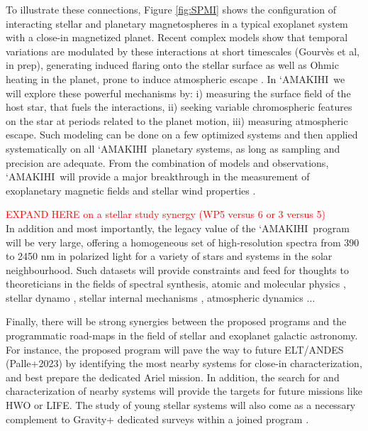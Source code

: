 \documentclass[
    traditabstract,
    longauth,
    onecolumn,
]{aa}
\def \amakihi{`AMAKIHI}
\begin{document}
To illustrate these connections, Figure \ref{fig:SPMI} shows the configuration of interacting stellar and planetary magnetospheres in a typical exoplanet system with a close-in magnetized planet. Recent complex models show that temporal variations are modulated by these interactions at short timescales (Gourv\`es et al, in prep), generating induced flaring onto the stellar surface as well as Ohmic heating in the planet, prone to induce atmospheric escape \citep{strugarek2025}. In \amakihi\, we will explore these powerful mechanisms by: i) measuring the surface field of the host star, that fuels the interactions, ii) seeking variable chromospheric features on the star at periods related to the planet motion, iii) measuring atmospheric escape. Such modeling can be done on a few optimized systems and then applied systematically on all \amakihi\ planetary systems, as long as sampling and precision are adequate. From the combination of models and observations, \amakihi\ will provide a major breakthrough in the measurement of exoplanetary magnetic fields and stellar wind properties \citep{vidotto2025}.

\textcolor{red}{EXPAND HERE on a stellar study synergy (WP5 versus 6 or 3 versus 5)}\\

In addition and most importantly, the legacy value of the \amakihi\ program will be very large, offering a homogeneous set of high-resolution spectra from 390 to 2450 nm in polarized light for a variety of stars and systems in the solar neighbourhood. Such datasets will provide constraints and feed for thoughts to theoreticians in the fields of spectral synthesis, atomic and molecular physics \citep{crozet2023}, stellar dynamo \citep{zaire2022}, stellar internal mechanisms \citep{jouve2020}, atmospheric dynamics \citep{dhouib2024}...


Finally, there will be strong synergies between the proposed programs and the programmatic road-maps in the field of stellar and exoplanet galactic astronomy. For instance, the proposed program will pave the way to future ELT/ANDES  (Palle+2023) by identifying the most nearby systems for close-in characterization, and best prepare the dedicated Ariel mission. In addition, the search for and characterization of nearby systems will provide the targets for future missions like HWO or LIFE. The study of young stellar systems will also come as a necessary complement to Gravity+ dedicated surveys within a joined program \citep{perraut2026, donati2026}.
\end{document}
